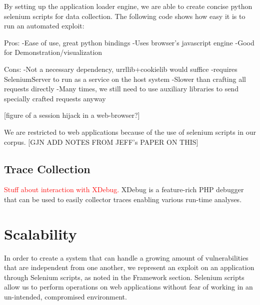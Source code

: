 \documentclass[letterpaper,twocolumn,10pt]{article}
\begin{document}
By setting up the application loader engine, we are able to create concise python selenium scripts for data collection.  The following code shows how easy it is to run an automated exploit:

Pros:
-Ease of use, great python bindings
-Uses browser's javascript engine
-Good for Demonstration/visualization

Cons:
-Not a necessary dependency, urrllib+cookielib would suffice
-requires SeleniumServer to run as a service on the host system
-Slower than crafting all requests directly
-Many times, we still need to use auxiliary libraries to send specially crafted requests anyway

[figure of a session hijack in a web-browser?]

We are restricted to web applications because of the use of selenium scripts in our corpus. [GJN ADD NOTES FROM JEFF's PAPER ON THIS]  


%
%
%

%


\subsection{Trace Collection}
\textcolor{red}{
Stuff about interaction with XDebug.
}
XDebug is a feature-rich PHP debugger that can be used to easily collector traces enabling various run-time analyses.\par




\section{Scalability}
In order to create a system that can handle a growing amount of vulnerabilities that are independent from one another, we represent an exploit on an application through  Selenium scripts, as noted in the Framework section.  Selenium scripts allow us to perform operations on web applications without fear of working in an un-intended, compromised environment. 
\end{document}
